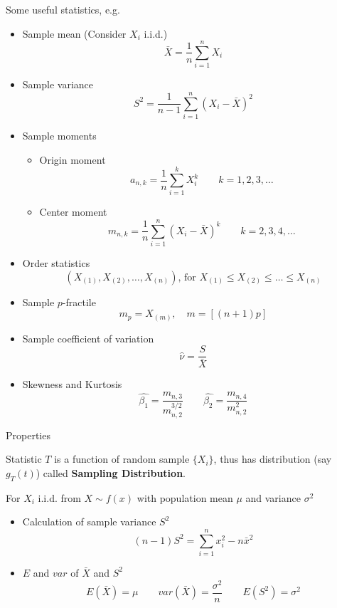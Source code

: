     Some useful statistics, e.g.
    \begin{itemize}
        \item Sample mean (Consider $X_i$ i.i.d.)
        \[
            \bar{X}=\frac{1}{n}\sum_{i=1}^n X_i
        \]
        \item Sample variance
        \[
            S^2=\frac{1}{n-1}\sum_{i=1}^n(X_i-\bar{X})^2  
        \]
        \item Sample moments
        \begin{itemize}
            \item Origin moment
            \[
                a_{n,k}=\frac{1}{n}\sum_{i=1}^k X_i^k\qquad k=1,2,3,\ldots    
            \]
            \item Center moment
            \[
                m_{n,k}=\frac{1}{n}\sum_{i=1}^n (X_i-\bar{X})^k\qquad k=2,3,4,\ldots    
            \]
        \end{itemize}
        \item Order statistics
        \[
            (X_{(1)},X_{(2)},\ldots,X_{(n)}),\,\text{for }X_{(1)}\leq X_{(2)} \leq \ldots\leq X_{(n)}    
        \]
        \item Sample $p$-fractile
        \[
            m_p=X_{(m)},\quad m=[(n+1)p]   
        \]
        \item Sample coefficient of variation
        \[
            \hat{\nu}=\frac{S}{\bar{X}}    
        \]
        \item Skewness and Kurtosis
        \[
            \hat{\beta_1}=\frac{m_{n,3}}{m_{n,2}^{3/2}}\qquad \hat{\beta_2}=\frac{m_{n,4}}{m_{n,2}^2}    
        \]
    \end{itemize}

    \begin{point}
        Properties
    \end{point}
    
        

    Statistic $T$ is a function of random sample $\{X_i\}$, thus has distribution (say $g_T(t)$) called \textbf{Sampling Distribution}.

        For $X_i$ i.i.d. from $X\sim f(x)$ with population mean $\mu$ and variance $\sigma^2$
    \begin{itemize}
        \item Calculation of sample variance $S^2$
        \[(n-1)S^2=\sum_{i=1}^n x_i^2-n\bar{x}^2\]
        \item $E$ and $var$ of $\bar{X}$ and $S^2$
        \[E(\bar{X})=\mu\qquad var(\bar{X})=\frac{\sigma^2}{n}\qquad E(S^2)=\sigma^2\]
    \end{itemize}

